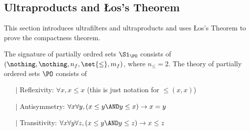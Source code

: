 \subsection{Ultraproducts and Łos's Theorem}
This section introduces ultrafilters and ultraproducts and uses Łos's Theorem
to prove the compactness theorem.
\begin{dfn}
    The signature of partially ordred sets $\Si_\PO$ consists of 
    $(\nothing,\nothing ,n_f,\set{\leq},m_f)$,
    where $n_\leq = 2$.
    The theory of partially ordered sets $\PO$ consists of 
    \begin{itemize}
        \item[$\vert$] Reflexivity: 
            $\forall x, 
            x \leq x$ (this is just notation for $\leq(x,x)$)
        \item[$\vert$] Antisymmetry: 
            $\forall x \forall y, 
            (x \leq y \AND y \leq x) \to x = y$
        \item[$\vert$] Transitivity:
            $\forall x \forall y \forall z, 
            (x \leq y \AND y \leq z) \to x \leq z$
    \end{itemize}
\end{dfn}

